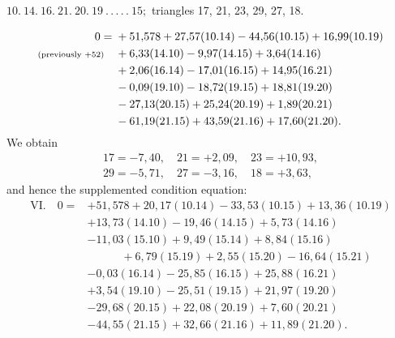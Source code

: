 \par\bigskip
\begin{center}
$10.\ 14.\ 16.\ 21.\ 20.\ 19\ .\,.\,.\,.\,.\ 15;$ triangles 17, 21, 23, 29, 27, 18.
\end{center}
\[
\begin{aligned}
0={}&+51{,}578+27{,}57(10.14)-44{,}56(10.15)+16{,}99(10.19)\\
\text{\scriptsize(previously $+52$)}\quad&+6{,}33(14.10)-9{,}97(14.15)+3{,}64(14.16)\\
&+2{,}06(16.14)-17{,}01(16.15)+14{,}95(16.21)\\
&-0{,}09(19.10)-18{,}72(19.15)+18{,}81(19.20)\\
&-27{,}13(20.15)+25{,}24(20.19)+1{,}89(20.21)\\
&-61{,}19(21.15)+43{,}59(21.16)+17{,}60(21.20).
\end{aligned}
\]
We obtain
\[
\begin{gathered}
17=-7{,}40,\quad21=+2{,}09,\quad23=+10{,}93,\\
29=-5{,}71,\quad27=-3{,}16,\quad18=+3{,}63,
\end{gathered}
\]
and hence the supplemented condition equation:
\[
\begin{aligned}
\mathrm{VI.}\quad0={}&+51{,}578+20{,}17(10.14)-33{,}53(10.15)+13{,}36(10.19)\\
&+13{,}73(14.10)-19{,}46(14.15)+5{,}73(14.16)\\
&-11{,}03(15.10)+9{,}49(15.14)+8{,}84(15.16)\\
&\qquad\quad+6{,}79(15.19)+2{,}55(15.20)-16{,}64(15.21)\\
&-0{,}03(16.14)-25{,}85(16.15)+25{,}88(16.21)\\
&+3{,}54(19.10)-25{,}51(19.15)+21{,}97(19.20)\\
&-29{,}68(20.15)+22{,}08(20.19)+7{,}60(20.21)\\
&-44{,}55(21.15)+32{,}66(21.16)+11{,}89(21.20).
\end{aligned}
\]
